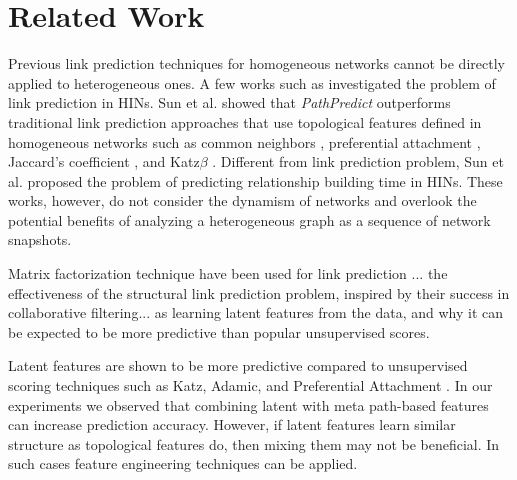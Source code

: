 \section{Related Work}

Previous link prediction techniques for homogeneous networks \cite{liben2007link,wang2007local,lichtenwalter2010new,leroy2010cold,al2006link} cannot be directly applied to heterogeneous ones. A few works such as \cite{sun2011ASONAM, Sun:2012:HRP:2124295.2124373} investigated the problem of link prediction in HINs. Sun et al. \cite{sun2011ASONAM} showed that \textit{PathPredict} outperforms traditional link prediction approaches that use topological features defined in homogeneous networks such as common neighbors \cite{newman2001clustering}, preferential attachment \cite{newman2001clustering}, Jaccard's coefficient \cite{liben2007link}, and Katz$\beta$ \cite{katz1953new}. Different from link prediction problem, Sun et al. \cite{Sun:2012:HRP:2124295.2124373} proposed the problem of predicting relationship building time in HINs. These works, however, do not consider the dynamism of networks and overlook the potential benefits of analyzing a heterogeneous graph as a sequence of network snapshots.


Matrix factorization technique have been used for link prediction \cite{menon2011link}... the effectiveness of the structural link prediction problem, inspired by their success in collaborative filtering... as learning latent features from the data, and why it can be expected to be more predictive than popular unsupervised scores. 

Latent features are shown to be more predictive compared to unsupervised scoring techniques such as Katz, Adamic, and Preferential Attachment \cite{menon2011link,Zhu2016}. In our experiments we observed that combining latent with meta path-based features can increase prediction accuracy. However, if latent features learn similar structure as topological features do, then mixing them may not be beneficial. In such cases feature engineering techniques can be applied. 


\cite{Yang2012} 



